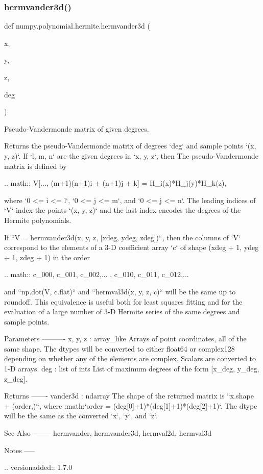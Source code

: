 \subsubsection{\texorpdfstring{hermvander3d()}{hermvander3d()}}
{\footnotesize\ttfamily def numpy.\+polynomial.\+hermite.\+hermvander3d (\begin{DoxyParamCaption}\item[{}]{x,  }\item[{}]{y,  }\item[{}]{z,  }\item[{}]{deg }\end{DoxyParamCaption})}

\begin{DoxyVerb}Pseudo-Vandermonde matrix of given degrees.

Returns the pseudo-Vandermonde matrix of degrees `deg` and sample
points `(x, y, z)`. If `l, m, n` are the given degrees in `x, y, z`,
then The pseudo-Vandermonde matrix is defined by

.. math:: V[..., (m+1)(n+1)i + (n+1)j + k] = H_i(x)*H_j(y)*H_k(z),

where `0 <= i <= l`, `0 <= j <= m`, and `0 <= j <= n`.  The leading
indices of `V` index the points `(x, y, z)` and the last index encodes
the degrees of the Hermite polynomials.

If ``V = hermvander3d(x, y, z, [xdeg, ydeg, zdeg])``, then the columns
of `V` correspond to the elements of a 3-D coefficient array `c` of
shape (xdeg + 1, ydeg + 1, zdeg + 1) in the order

.. math:: c_{000}, c_{001}, c_{002},... , c_{010}, c_{011}, c_{012},...

and  ``np.dot(V, c.flat)`` and ``hermval3d(x, y, z, c)`` will be the
same up to roundoff. This equivalence is useful both for least squares
fitting and for the evaluation of a large number of 3-D Hermite
series of the same degrees and sample points.

Parameters
----------
x, y, z : array_like
    Arrays of point coordinates, all of the same shape. The dtypes will
    be converted to either float64 or complex128 depending on whether
    any of the elements are complex. Scalars are converted to 1-D
    arrays.
deg : list of ints
    List of maximum degrees of the form [x_deg, y_deg, z_deg].

Returns
-------
vander3d : ndarray
    The shape of the returned matrix is ``x.shape + (order,)``, where
    :math:`order = (deg[0]+1)*(deg[1]+1)*(deg[2]+1)`.  The dtype will
    be the same as the converted `x`, `y`, and `z`.

See Also
--------
hermvander, hermvander3d, hermval2d, hermval3d

Notes
-----

.. versionadded:: 1.7.0\end{DoxyVerb}
 \mbox{\label{namespacenumpy_1_1polynomial_1_1hermite_aceb17ee21a23a90b1948210b7fdb8f66}} 

